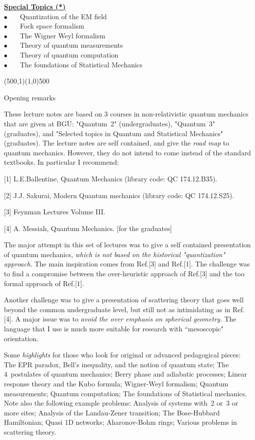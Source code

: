\documentclass[onecolumn,fleqn]{revtex4}
\newcommand{\bitem}{$\bullet$ \ \ \ }
\newcommand{\drawline}{\begin{picture}(500,1)\line(1,0){500}\end{picture}}
\newcommand{\Cn}[1]{\begin{center} #1 \end{center}}
\begin{document}
{\hyperlink{shdA10.1}{\bf Special Topics (*) } \\

\bitem Quantization of the EM field \\   
\bitem Fock space formalism \\

\bitem The Wigner Weyl formalism \\
\bitem Theory of quantum measurements \\ 
\bitem Theory of quantum computation \\
\bitem The foundations of Statistical Mechanics  

}


\drawline


\newpage


\Cn{\LARGE Opening remarks}

These lecture notes are based on 3 courses in 
non-relativistic quantum mechanics that are 
given at BGU: "Quantum~2" (undergraduates), 
"Quantum~3" (graduates), and 
"Selected topics in Quantum and Statistical Mechanics" (graduates). 
The lecture notes are self contained, 
and give the {\em road map} to quantum mechanics. 
However, they do not intend to come instead 
of the standard textbooks. In particular I recommend:

[1] L.E.Ballentine, Quantum Mechanics (library code: QC 174.12.B35).

[2] J.J. Sakurai, Modern Quantum mechanics (library code: QC 174.12.S25).

[3] Feynman Lectures Volume III.

[4] A. Messiah, Quantum Mechanics. [for the graduates]


The major attempt in this set of lectures was 
to give a self contained presentation 
of quantum mechanics, {\em which is not based 
on the historical "quantization" approach}. 
The main inspiration comes from Ref.[3] and Ref.[1].
The challenge was to find a compromise 
between the over-heuristic approach of Ref.[3] 
and the too formal approach of Ref.[1]. 

Another challenge was to give a presentation 
of scattering theory that goes well beyond the common 
undergraduate level, but still not as intimidating 
as in Ref.[4]. A major issue was to {\em avoid 
the over emphasis on spherical geometry}. 
The language that I use is much more suitable 
for research with ``mesoscopic" orientation.  


Some {\em highlights} for those who look for original 
or advanced pedagogical pieces: 
The EPR paradox, Bell's inequality, and the notion of quantum state;    
The 4~postulates of quantum mechanics; 
Berry phase and adiabatic processes; 
Linear response theory and the Kubo formula; 
Wigner-Weyl formalism; 
Quantum measurements; 
Quantum computation; 
The foundations of Statistical mechanics. 
Note also the following example problems: 
Analysis of systems with~2 or~3 or more sites;
Analysis of the Landau-Zener transition; 
The Bose-Hubbard Hamiltonian;  
Quasi 1D networks; 
Aharonov-Bohm rings; 
Various problems in scattering theory.  
\end{document}

